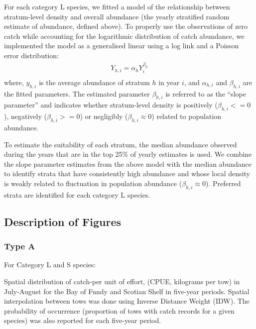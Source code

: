 \documentclass[12pt]{article}\usepackage[]{graphicx}\usepackage[]{color}
\begin{document}
For each category L species, we fitted a model of the relationship between stratum-level density and overall abundance (the yearly stratified random estimate of abundance, defined above). To properly use the observations of zero catch while accounting for the logarithmic distribution of catch abundance, we implemented the model as a generalised linear using a log link and a Poisson error distribution:
\begin{eqnarray*}\label{eqHabitat Selection}
Y_{h,i} = \alpha_{h} Y_{i}^{\beta_h}
\\
\end{eqnarray*}
where, \(y_{h,i}\) is the average abundance of stratum \(h\) in year \(i\), and \(\alpha_{h,i}\) and \(\beta_{h,i}\) are the fitted parameters. The estimated parameter \(\beta_{h,i}\) is referred to as the ``slope parameter'' and indicates whether stratum-level density is positively (\(\beta_{h,i} <= 0\)), negatively (\(\beta_{h,i} >= 0\)) or negligibly (\(\beta_{h,i} \approx 0\)) related to population abundance.

To estimate the suitability of each stratum, the median abundance observed during the years that are in the top 25\% of yearly estimates is used. We combine the slope parameter estimates from the above model with the median abundance to identify strata that have consistently high abundance and whose local density is weakly related to fluctuation in population abundance (\(\beta_{h,i} \approx 0\)). Preferred strata are identified for each category L species.

\hypertarget{description-of-figures}{%
\subsection{Description of Figures}\label{description-of-figures}}

\hypertarget{type-a}{%
\subsubsection{Type A}\label{type-a}}

For Category L and S species:

Spatial distribution of catch-per unit of effort, (CPUE, kilograms per tow) in July-August for the Bay of Fundy and Scotian Shelf in five-year periods. Spatial interpolation between tows was done using Inverse Distance Weight (IDW). The probability of occurrence (proportion of tows with catch records for a given species) was also reported for each five-year period.
\end{document}

